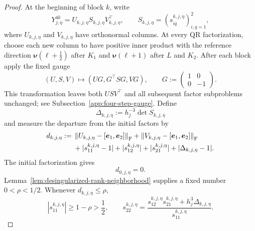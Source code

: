 \documentclass[10pt,a4paper]{amsart}
\numberwithin{equation}{section}
\newcommand{\F}{\mathrm F}
\newcommand{\norm}[1]{\left\lVert #1\right\rVert}
\begin{document}
\begin{proof}
At the beginning of block $k$, write
\begin{equation}\label{eq:block-factorization}
 Y_{j,\eta}^{4k}=U_{k,j,\eta}S_{k,j,\eta}V_{k,j,\eta}^{\top},
 \qquad
 S_{k,j,\eta}=(s_{iq}^{k,j,\eta})_{i,q=1}^2,
\end{equation}
where $U_{k,j,\eta}$ and $V_{k,j,\eta}$ have orthonormal columns.
At every QR factorization, choose each new column to have positive
inner product with the reference direction
$\boldsymbol\nu(\ell+\tfrac12)$ after $K_1$ and
$\boldsymbol\nu(\ell+1)$ after $L$ and $K_2$.  After each block
apply the fixed gauge
\begin{equation}\label{eq:block-gauge-main}
 (U,S,V)\longmapsto(UG,G^\top SG,VG),
 \qquad G:=\begin{pmatrix}1&0\\0&-1\end{pmatrix}.
\end{equation}
This transformation leaves both $USV^\top$ and all subsequent factor
subproblems unchanged; see Subsection~\ref{app:four-step-gauge}.
Define
\begin{equation}\label{eq:block-core-determinant}
 \Delta_{k,j,\eta}:=h_j^{-3}\det S_{k,j,\eta}
\end{equation}
and measure the departure from the initial factors by
\begin{align}
 d_{k,j,\eta}:={}&
 \norm{U_{k,j,\eta}-[\boldsymbol e_1,\boldsymbol e_2]}_{\F}
 +\norm{V_{k,j,\eta}-[\boldsymbol e_1,\boldsymbol e_2]}_{\F}
 \notag\\
 &+|s_{11}^{k,j,\eta}-1|+|s_{12}^{k,j,\eta}|
 +|s_{21}^{k,j,\eta}|+|\Delta_{k,j,\eta}-1|.
 \label{eq:block-factor-distance}
\end{align}
The initial factorization gives
\begin{equation}\label{eq:block-factor-distance-initial}
 d_{0,j,\eta}=0.
\end{equation}
Lemma~\ref{lem:desingularized-rank-neighborhood} supplies a fixed number
\(0<\rho<1/2\).  Whenever \(d_{k,j,\eta}\le\rho\),
\begin{equation}\label{eq:block-core-chart}
 |s_{11}^{k,j,\eta}|\ge1-\rho>\frac12,
 \qquad
 s_{22}^{k,j,\eta}
 =\frac{s_{12}^{k,j,\eta}s_{21}^{k,j,\eta}
       +h_j^3\Delta_{k,j,\eta}}{s_{11}^{k,j,\eta}}.
\end{equation}


\end{proof}
\end{document}
